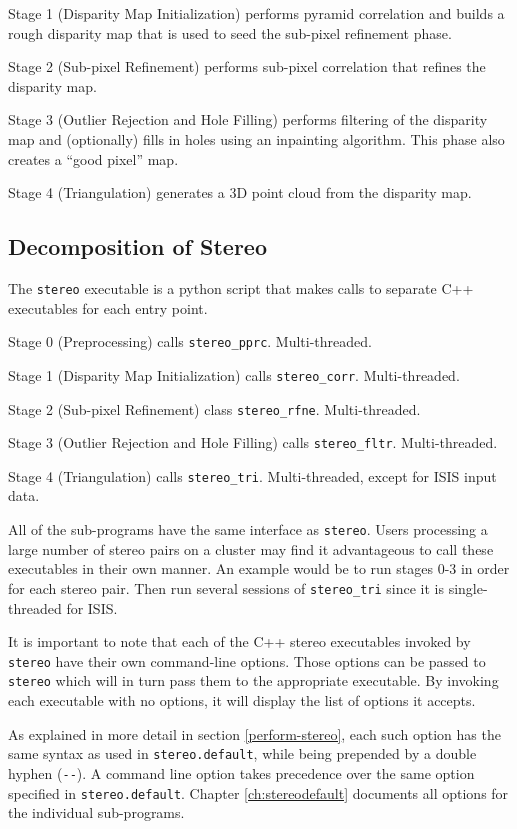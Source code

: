 Stage 1 (Disparity Map Initialization) performs pyramid correlation and builds a rough disparity map that is used to seed the sub-pixel refinement phase.

Stage 2 (Sub-pixel Refinement) performs sub-pixel correlation that
refines the disparity map.

Stage 3 (Outlier Rejection and Hole Filling) performs filtering of the
disparity map and (optionally) fills in holes using an inpainting
algorithm.  This phase also creates a ``good pixel'' map.

Stage 4 (Triangulation) generates a 3D point cloud from the disparity
map.

\subsection{Decomposition of Stereo}
\label{stereo_dec}

The \texttt{stereo}
executable is a python script that makes calls to separate
C++ executables for each entry point.

Stage 0 (Preprocessing) calls \texttt{stereo\_pprc}. Multi-threaded.

Stage 1 (Disparity Map Initialization) calls
\texttt{stereo\_corr}. Multi-threaded.

Stage 2 (Sub-pixel Refinement) class \texttt{stereo\_rfne}. Multi-threaded.

Stage 3 (Outlier Rejection and Hole Filling) calls
\texttt{stereo\_fltr}. Multi-threaded.

Stage 4 (Triangulation) calls \texttt{stereo\_tri}. Multi-threaded,
except for ISIS input data.

All of the sub-programs have the same interface as
\texttt{stereo}. Users processing a large number of stereo pairs on a
cluster may find it advantageous to call these executables in their own
manner. An example would be to run stages 0-3 in order for each stereo
pair. Then run several sessions of \texttt{stereo\_tri} since it is
single-threaded for ISIS.

It is important to note that each of the C++ stereo executables invoked
by \texttt{stereo} have their own command-line options. Those options
can be passed to \texttt{stereo} which will in turn pass them to the
appropriate executable. By invoking each executable with no options, it
will display the list of options it accepts.

As explained in more detail
in section \ref{perform-stereo}, each such option has the same syntax as
used in \texttt{stereo.default}, while being prepended by a double hyphen
(\texttt{-\/-}).  A command line option takes precedence over the same
option specified in \texttt{stereo.default}. Chapter \ref{ch:stereodefault}
documents all options for the individual sub-programs.


